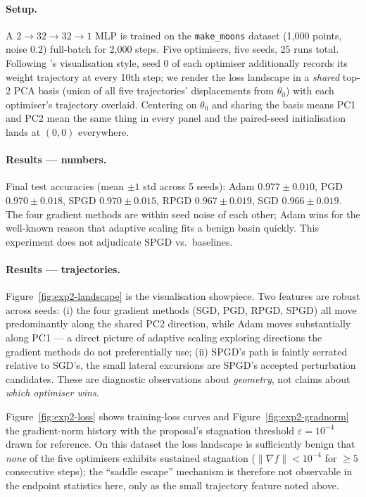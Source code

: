 \documentclass[11pt]{article}
\begin{document}
\paragraph{Setup.} A $2 \to 32 \to 32 \to 1$ MLP is trained on the
\texttt{make\_moons} dataset (1{,}000 points, noise $0.2$) full-batch
for 2{,}000 steps. Five optimisers, five seeds, 25 runs total.
Following \citet{vahedi2024spgd}'s visualisation style, seed 0 of each
optimiser additionally records its weight trajectory at every 10th
step; we render the loss landscape in a \emph{shared} top-2 PCA basis
(union of all five trajectories' displacements from $\theta_0$) with
each optimiser's trajectory overlaid.  Centering on $\theta_0$ and
sharing the basis means PC1 and PC2 mean the same thing in every
panel and the paired-seed initialisation lands at $(0,0)$ everywhere.

\paragraph{Results --- numbers.}  Final test accuracies
(mean $\pm 1$ std across 5 seeds): Adam $0.977 \pm 0.010$,
PGD $0.970 \pm 0.018$, SPGD $0.970 \pm 0.015$,
RPGD $0.967 \pm 0.019$, SGD $0.966 \pm 0.019$.  The four gradient
methods are within seed noise of each other; Adam wins for the
well-known reason that adaptive scaling fits a benign basin
quickly.  This experiment does not adjudicate SPGD vs.\ baselines.

\paragraph{Results --- trajectories.}
Figure~\ref{fig:exp2-landscape} is the visualisation showpiece.  Two
features are robust across seeds: (i) the four gradient methods (SGD,
PGD, RPGD, SPGD) all move predominantly along the shared PC2
direction, while Adam moves substantially along PC1 --- a direct
picture of adaptive scaling exploring directions the gradient methods
do not preferentially use; (ii) SPGD's path is faintly serrated
relative to SGD's, the small lateral excursions are SPGD's accepted
perturbation candidates.  These are diagnostic observations about
\emph{geometry}, not claims about \emph{which optimiser wins}.

Figure~\ref{fig:exp2-loss} shows training-loss curves and
Figure~\ref{fig:exp2-gradnorm} the gradient-norm history with the
proposal's stagnation threshold $\varepsilon = 10^{-4}$ drawn for
reference.  On this dataset the loss landscape is sufficiently benign
that \emph{none} of the five optimisers exhibits sustained stagnation
($\|\nabla f\| < 10^{-4}$ for $\geq 5$ consecutive steps); the
``saddle escape'' mechanism is therefore not observable in the
endpoint statistics here, only as the small trajectory feature noted
above.
\end{document}
